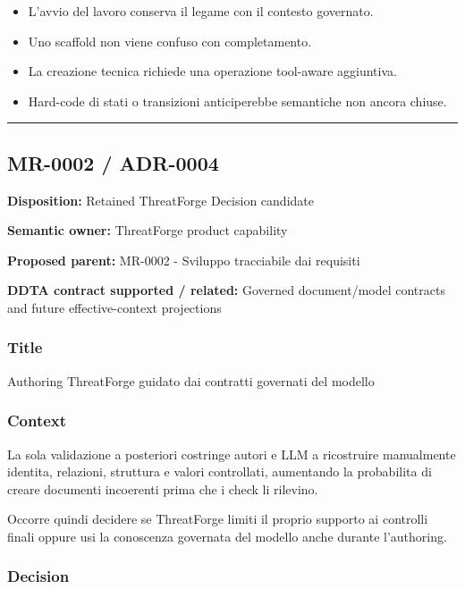 \documentclass[
  10pt,
  a4paper,
]{article}
\providecommand{\tightlist}{%
  \setlength{\itemsep}{0pt}\setlength{\parskip}{0pt}}
\begin{document}
\begin{itemize}
\tightlist
\item
  L'avvio del lavoro conserva il legame con il contesto governato.
\item
  Uno scaffold non viene confuso con completamento.
\item
  La creazione tecnica richiede una operazione tool-aware aggiuntiva.
\item
  Hard-code di stati o transizioni anticiperebbe semantiche non ancora
  chiuse.
\end{itemize}

\begin{center}\rule{0.5\linewidth}{0.5pt}\end{center}

\subsection{MR-0002 / ADR-0004}\label{mr-0002-adr-0004}

\textbf{Disposition:} Retained ThreatForge Decision candidate

\textbf{Semantic owner:} ThreatForge product capability

\textbf{Proposed parent:} MR-0002 - Sviluppo tracciabile dai requisiti

\textbf{DDTA contract supported / related:} Governed document/model
contracts and future effective-context projections

\subsubsection{Title}\label{title-11}

Authoring ThreatForge guidato dai contratti governati del modello

\subsubsection{Context}\label{context-11}

La sola validazione a posteriori costringe autori e LLM a ricostruire
manualmente identita, relazioni, struttura e valori controllati,
aumentando la probabilita di creare documenti incoerenti prima che i
check li rilevino.

Occorre quindi decidere se ThreatForge limiti il proprio supporto ai
controlli finali oppure usi la conoscenza governata del modello anche
durante l'authoring.

\subsubsection{Decision}\label{decision-11}
\end{document}
